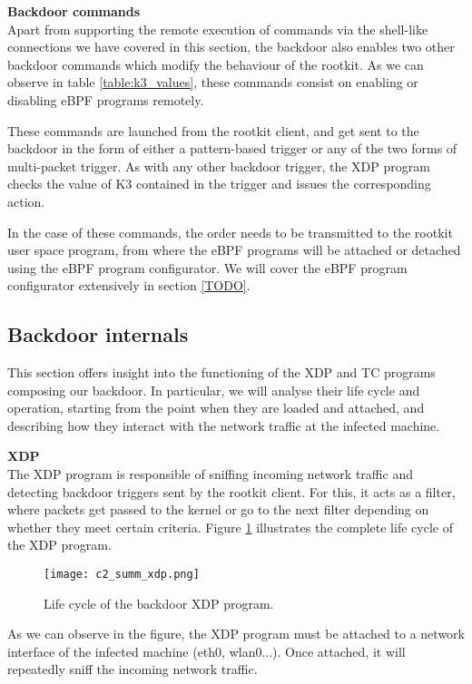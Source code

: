 \textbf{Backdoor commands}\\
Apart from supporting the remote execution of commands via the shell-like connections we have covered in this section, the backdoor also enables two other backdoor commands which modify the behaviour of the rootkit. As we can observe in table \ref{table:k3_values}, these commands consist on enabling or disabling eBPF programs remotely.

These commands are launched from the rootkit client, and get sent to the backdoor in the form of either a pattern-based trigger or any of the two forms of multi-packet trigger. As with any other backdoor trigger, the XDP program checks the value of K3 contained in the trigger and issues the corresponding action.

In the case of these commands, the order needs to be transmitted to the rootkit user space program, from where the eBPF programs will be attached or detached using the eBPF program configurator. We will cover the eBPF program configurator extensively in section \ref{TODO}.


\subsection{Backdoor internals}
This section offers insight into the functioning of the XDP and TC programs composing our backdoor. In particular, we will analyse their life cycle and operation, starting from the point when they are loaded and attached, and describing how they interact with the network traffic at the infected machine.

\textbf{XDP}\\
The XDP program is responsible of sniffing incoming network traffic and detecting backdoor triggers sent by the rootkit client. For this, it acts as a filter, where packets get passed to the kernel or go to the next filter depending on whether they meet certain criteria. Figure \ref{fig:c2_summ_xdp} illustrates the complete life cycle of the XDP program.

\begin{figure}[htbp]
	\centering
	\texttt{[image: c2\_summ\_xdp.png]}
	\caption{Life cycle of the backdoor XDP program.}
	\label{fig:c2_summ_xdp}
\end{figure}

As we can observe in the figure, the XDP program must be attached to a network interface of the infected machine (eth0, wlan0...). Once attached, it will repeatedly sniff the incoming network traffic.


